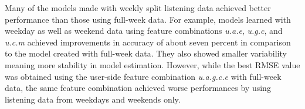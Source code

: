 Many of the models made with weekly split listening data achieved better performance than those using full-week data.  For example, models learned with weekday as well as weekend data using feature combinations \emph{u.a.e}, \emph{u.g.c}, and \emph{u.c.m} achieved improvements in accuracy of about seven percent in comparison to the model created with full-week data. They also showed smaller variability meaning more stability in model estimation.
However, while the best RMSE value was obtained using the user-side feature combination \emph{u.a.g.c.e} with full-week data, the same feature combination achieved worse performances by using listening data from weekdays and weekends only. 











